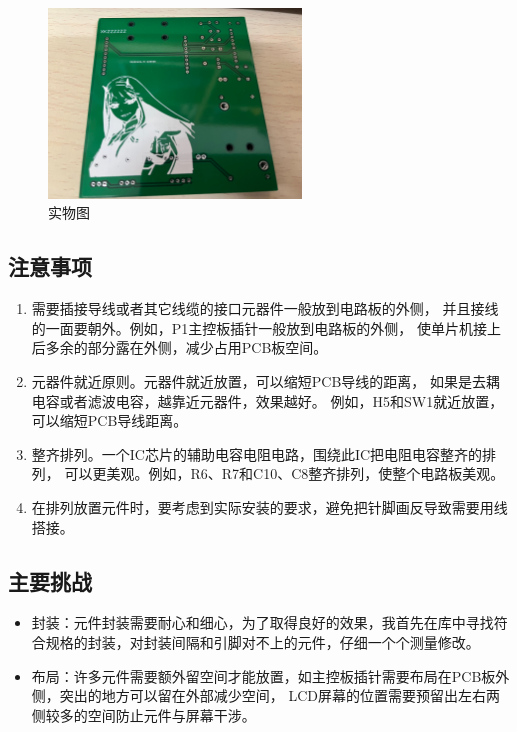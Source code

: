 \documentclass[a4paper,twoside,zihao=5,UTF8]{ctexart}
\begin{document}
\begin{spacing}{1.2}
\begin{figure}[htbp]
	\centering
	\caption{实物图}
	\label{fig:real}
	\includegraphics[width=0.6\textwidth]{real.jpg}
\end{figure}


\clearpage
\subsection{注意事项}

\begin{enumerate}
	\item 需要插接导线或者其它线缆的接口元器件一般放到电路板的外侧，
	并且接线的一面要朝外。例如，P1主控板插针一般放到电路板的外侧，
	使单片机接上后多余的部分露在外侧，减少占用PCB板空间。

	\item 元器件就近原则。元器件就近放置，可以缩短PCB导线的距离，
	如果是去耦电容或者滤波电容，越靠近元器件，效果越好。
	例如，H5和SW1就近放置，可以缩短PCB导线距离。

	\item 整齐排列。一个IC芯片的辅助电容电阻电路，围绕此IC把电阻电容整齐的排列，
	可以更美观。例如，R6、R7和C10、C8整齐排列，使整个电路板美观。

	\item 在排列放置元件时，要考虑到实际安装的要求，避免把针脚画反导致需要用线搭接。
\end{enumerate}

\subsection{主要挑战}

\begin{itemize}
	\item 封装：元件封装需要耐心和细心，为了取得良好的效果，我首先在库中寻找符合规格的封装，对封装间隔和引脚对不上的元件，仔细一个个测量修改。
	\item 布局：许多元件需要额外留空间才能放置，如主控板插针需要布局在PCB板外侧，突出的地方可以留在外部减少空间，
	LCD屏幕的位置需要预留出左右两侧较多的空间防止元件与屏幕干涉。
\end{itemize}


\end{spacing}
\end{document}

